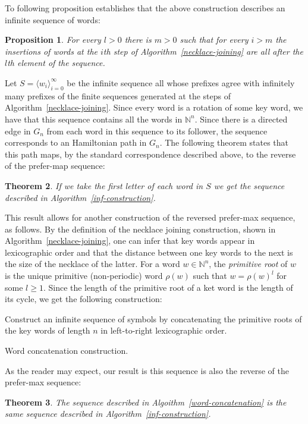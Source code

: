 \documentclass{article}
\newtheorem{theorem}{Theorem}
\newtheorem{proposition}[theorem]{Proposition}
\theoremstyle{definition}
\newcommand{\N}{{\mathbb{N}}}
\newcommand{\T}[1]{\langle{#1}\rangle}
\begin{document}
To following proposition establishes that the above construction describes an infinite sequence of words:

\begin{proposition}
	For every $l>0$ there is $m>0$ such that for every $i>m$ the insertions of words at the $i$th step of Algorithm~\ref{necklace-joining} are all after the $l$th element of the sequence.
\end{proposition}

Let $S=\T{w_i}_{i=0}^\infty$ be the infinite sequence all whose prefixes agree with infinitely many prefixes of the finite sequences generated at the steps of Algorithm~\ref{necklace-joining}. Since every word is a rotation of some key word, we have that this sequence contains all the words in $\N^n$. Since there is a directed edge in $G_n$ from each word in this sequence to its follower, the sequence corresponds to an Hamiltonian path in $G_n$. The following theorem states that this path maps, by the standard correspondence described above, to the reverse of the prefer-map sequence:

\begin{theorem}
	If we take the first letter of each word in $S$ we get the sequence described in Algorithm~\ref{inf-construction}.
\end{theorem}

This result allows for another construction of the reversed prefer-max sequence, as follows. By the definition of the necklace joining construction, shown in Algorithm~\ref{necklace-joining}, one can infer that key words appear in lexicographic order and that the distance between one key words to the next is the size of the necklace of the latter. For a word $w\in\N^n$, the \emph{primitive root} of $w$ is the  unique primitive (non-periodic) word $\rho(w)$ such that $w = \rho(w)^l$ for some $l \geq 1$. Since the length of the primitive root of a ket word is the length of its cycle, we get the following construction:


\begin{algorithm}[!h]
	Construct an infinite sequence of symbols by concatenating the primitive roots  of the key words of length $n$ in left-to-right lexicographic order.
	\caption{Word concatenation construction.}
	\label{word-concatenation}
\end{algorithm}

As the reader may expect, our result is this sequence is also the reverse of the prefer-max sequence:

\begin{theorem}
	The sequence described in Algoithm~\ref{word-concatenation} is the same sequence described in Algorithm~\ref{inf-construction}.
\end{theorem}
\end{document}
